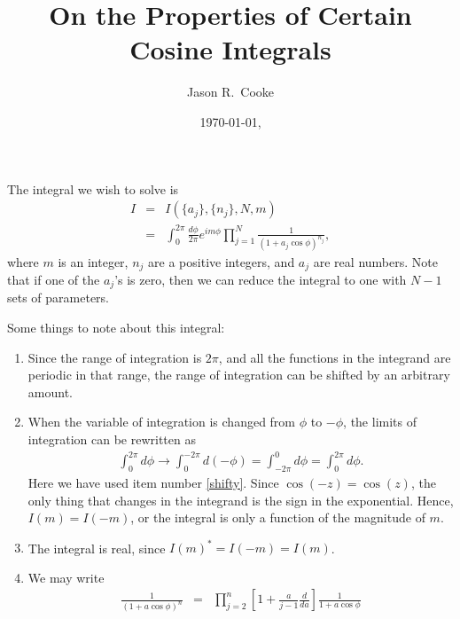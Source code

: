 \documentclass[aps,prc,preprint,tightenlines]{revtex4}
\begin{document}
\title{On the Properties of Certain Cosine Integrals}
\author{Jason R.\ Cooke}
\date{\today, \texttt{\jobname}}
\noaffiliation
\maketitle

The integral we wish to solve is
\begin{eqnarray}
I
&=& I(\{a_j\},\{n_j\},N,m) \nonumber \\
&=& \int_0^{2\pi} \frac{d\phi}{2\pi} e^{i m \phi} 
\prod_{j=1}^N \frac{1}{(1 + a_j \cos \phi)^{n_j}},
\end{eqnarray}
where $m$ is an integer, $n_j$ are a positive integers, and $a_j$ are
real numbers. Note that if one of the $a_j$'s is zero, then we can
reduce the integral to one with $N-1$ sets of parameters.

Some things to note about this integral:
\begin{enumerate}
\item{} \label{shifty} 
Since the range of integration is $2\pi$, and all the functions in the
integrand are periodic in that range, the range of integration can be
shifted by an arbitrary amount.
\item{} \label{swapy} 
When the variable of integration is changed from $\phi$ to $-\phi$,
the limits of integration can be rewritten as
\begin{eqnarray}
\int_0^{2\pi} d\phi \rightarrow 
\int_0^{-2\pi} d(-\phi) =
\int_{-2\pi}^0 d\phi =
\int_0^{2\pi} d\phi. 
\end{eqnarray}
Here we have used item number \ref{shifty}.  Since $\cos(-z)=\cos(z)$,
the only thing that changes in the integrand is the sign in the exponential.
Hence, $I(m)=I(-m)$, or the integral is only a function of the
magnitude of $m$.
\item{} The integral is real, since $I(m)^*=I(-m)=I(m)$.
\item{} We may write
\begin{eqnarray}
\frac{1}{(1+a\cos \phi)^n}
&=& \prod_{j=2}^n \left[ 1 + \frac{a}{j-1} \frac{d}{da} \right]
\frac{1}{1+a\cos \phi}
\end{eqnarray}

\end{enumerate}
\end{document}
